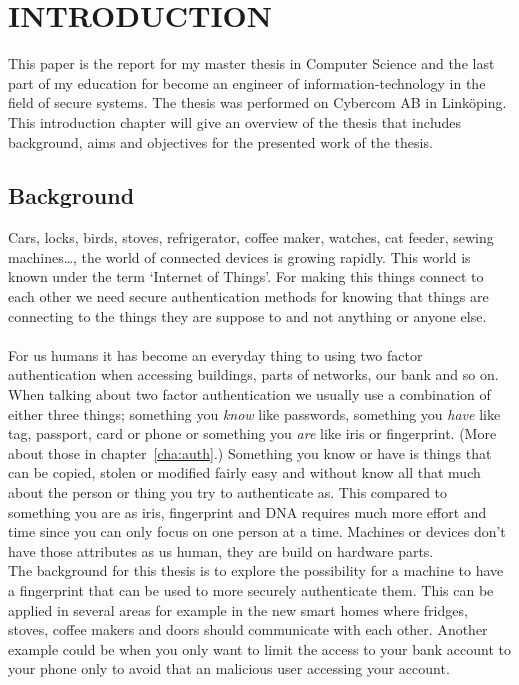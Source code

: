 \chapter{INTRODUCTION}\label{cha:intro}
This paper is the report for my master thesis in Computer Science and the last part of my education for become an engineer of information-technology in the field of secure systems. The thesis was performed on Cybercom AB in Linköping. \\
This introduction chapter will give an overview of the thesis that includes background, aims and objectives for the presented work of the thesis. 

\section{Background}\label{sec:bg}
Cars, locks, birds, stoves, refrigerator, coffee maker, watches, cat feeder, sewing machines\dots, the world of connected devices is growing rapidly. This world is known under the term `Internet of Things'. For making this things connect to each other we need secure authentication methods for knowing that things are connecting to the things they are suppose to and not anything or anyone else. \\
\\
For us humans it has become an everyday thing to using two factor authentication when accessing buildings, parts of networks, our bank and so on. When talking about two factor authentication we usually use a combination of either three things; something you \textit{know} like passwords, something you \textit{have} like tag, passport, card or phone or something you \textit{are} like iris or fingerprint.
(More about those in chapter~\ref{cha:auth}.)
Something you know or have is things that can be copied, stolen or modified fairly easy and without know all that much about the person or thing you try to authenticate as. This compared to something you are as iris, fingerprint and DNA requires much more effort and time since you can only focus on one person at a time. Machines or devices don't have those attributes as us human, they are build on hardware parts.\\ 
The background for this thesis is to explore the possibility for a machine to have a fingerprint that can be used to more securely authenticate them. This can be applied in several areas for example in the new smart homes where fridges, stoves, coffee makers and doors should communicate with each other. Another example could be when you only want to limit the access to your bank account to your phone only to avoid that an malicious user accessing your account.

